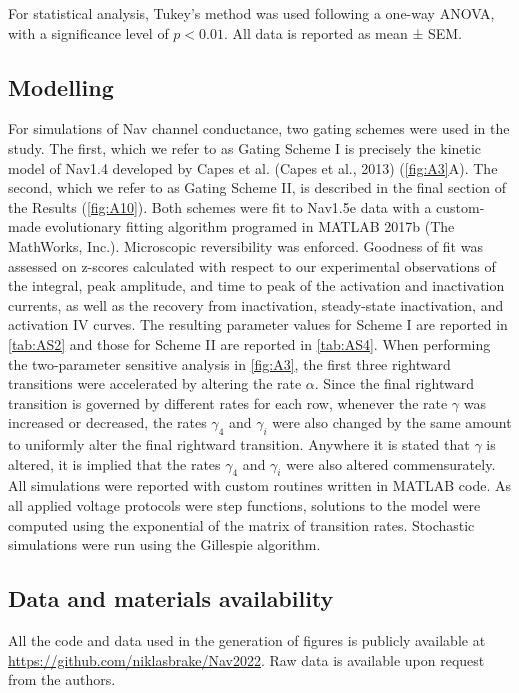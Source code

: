 For statistical analysis, Tukey’s method was used following a one-way ANOVA, with a significance level of $p<0.01$. All data is reported as mean ± SEM. 

\subsection{Modelling}
For simulations of Nav channel conductance, two gating schemes were used in the study. The first, which we refer to as Gating Scheme I is precisely the kinetic model of Nav1.4 developed by Capes et al. (Capes et al., 2013) (\autoref{fig:A3}A). The second, which we refer to as Gating Scheme II, is described in the final section of the Results (\autoref{fig:A10}). Both schemes were fit to Nav1.5e data with a custom-made evolutionary fitting algorithm programed in MATLAB 2017b (The MathWorks, Inc.). Microscopic reversibility was enforced. Goodness of fit was assessed on z-scores calculated with respect to our experimental observations of the integral, peak amplitude, and time to peak of the activation and inactivation currents, as well as the recovery from inactivation, steady-state inactivation, and activation IV curves. The resulting parameter values for Scheme I are reported in \autoref{tab:AS2} and those for Scheme II are reported in \autoref{tab:AS4}.
When performing the two-parameter sensitive analysis in \autoref{fig:A3}, the first three rightward transitions were accelerated by altering the rate $\alpha$. Since the final rightward transition is governed by different rates for each row, whenever the rate $\gamma$ was increased or decreased, the rates $\gamma_4$ and $\gamma_i$ were also changed by the same amount to uniformly alter the final rightward transition. Anywhere it is stated that $\gamma$ is altered, it is implied that the rates $\gamma_4$ and $\gamma_i$ were also altered commensurately.
All simulations were reported with custom routines written in MATLAB code. As all applied voltage protocols were step functions, solutions to the model were computed using the exponential of the matrix of transition rates. Stochastic simulations were run using the Gillespie algorithm. 	

\subsection{Data and materials availability}
All the code and data used in the generation of figures is publicly available at \url{https://github.com/niklasbrake/Nav2022}. Raw data is available upon request from the authors.

